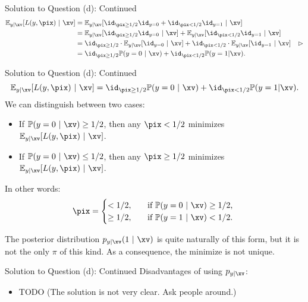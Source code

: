 \documentclass[aspectratio=169]{beamer}
\newcommand{\Eyx}{\mathbb{E}_{y|\xv}}
\newcommand{\Prob}{\mathbb{P}}
\begin{document}
\begin{frame}{Solution to Question (d): Continued}
	\begin{align*}
		\Eyx[L(y, \pix) \ | \ \xv]
		&= \Eyx[\id_{\pix \geq 1/2} \id_{y=0} + \id_{\pix < 1/2} \id_{y=1} \ | \ \xv] \\
		& = \Eyx[\id_{\pix \geq 1/2} \id_{y=0} \ | \ \xv] + \Eyx[ \id_{\pix < 1/2} \id_{y=1} \ | \ \xv] \\
		&= \id_{\pix \geq 1/2} \cdot \Eyx[\id_{y=0} \ | \ \xv] + \id_{\pix < 1/2} \cdot \Eyx[\id_{y=1} \ | \ \xv] \quad \rhd \\
		&= \id_{\pix \geq 1/2} \Prob(y = 0 \ | \ \xv) + \id_{\pix < 1/2} \Prob(y = 1 | \xv). \\
	\end{align*}
\end{frame}

\begin{frame}{Solution to Question (d): Continued}
	$$\Eyx[L(y, \pix) \ | \ \xv] = \id_{\pix \geq 1/2} \Prob(y = 0 \ | \ \xv) + \id_{\pix < 1/2} \Prob(y = 1 | \xv). $$
	We can distinguish between two cases:
	\begin{itemize}
		\item If $\Prob(y=0 \ | \ \xv) \geq 1/ 2$, then any $\pix < 1/2$ minimizes $\Eyx[L(y, \pix) \ | \ \xv]$.
		\item If $\Prob(y=0 \ | \ \xv) \leq 1/ 2$, then any $\pix \geq 1/2$ minimizes $\Eyx[L(y, \pix) \ | \ \xv]$.
	\end{itemize}
	In other words:
	$$
		\pix = \begin{cases}
			< 1/2, \quad &\text{if $\Prob(y = 0 \ | \ \xv) \geq 1 / 2$, } \\
			\geq 1/2, \quad &\text{if $\Prob(y=1 \ | \ \xv) < 1/2$.}
		\end{cases}
	$$
	
	The posterior distribution $p_{y | \xv} ( 1 \ | \ \xv)$ is quite naturally of this form, but it is not the only $\pi$ of this kind. As a consequence, the minimize is not unique.

\end{frame}

\begin{frame}{Solution to Question (d): Continued}
Disadvantages of using $p_{y | \xv}$:
\begin{itemize}
	\item TODO (The solution is not very clear. Ask people around.)
\end{itemize}
	
\end{frame}
\end{document}

